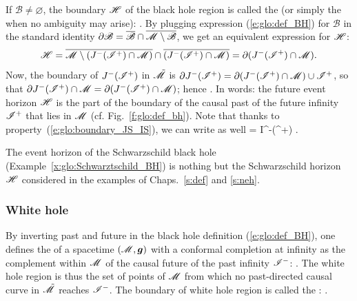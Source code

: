 If $\mathscr{B}\not=\varnothing$, the boundary $\mathscr{H}$ of the black hole region
is called the 
(or simply the 
when no ambiguity may arise):
\be
    .
\ee
By plugging expression (\ref{e:glo:def_BH}) for $\mathscr{B}$ in the standard
identity $\partial \mathscr{B} =
\overline{\mathscr{B}} \cap \overline{\mathscr{M}\setminus \mathscr{B}}$, we get
an equivalent expression for $\mathscr{H}$:
\[
    \mathscr{H} = \overline{\mathscr{M} \setminus (J^-(\mathscr{I}^+)\cap\mathscr{M})} \cap
        \overline{(J^-(\mathscr{I}^+)\cap\mathscr{M})}
        = \partial(J^-(\mathscr{I}^+)\cap\mathscr{M}) .
\]
Now, the boundary of $J^-(\mathscr{I}^+)$ in $\tilde{\mathscr{M}}$ is
$\partial J^-(\mathscr{I}^+) = \partial (J^-(\mathscr{I}^+)\cap\mathscr{M}) \cup \mathscr{I}^+$, so that
$\partial J^-(\mathscr{I}^+) \cap \mathscr{M} =  \partial(J^-(\mathscr{I}^+)\cap\mathscr{M})$; hence
\be \label{e:glo:Hor_bound_past_scrip}
    .
\ee
In words: the future event horizon $\mathscr{H}$ is the part of the boundary of the causal past
of the future infinity $\mathscr{I}^+$ that lies in $\mathscr{M}$ (cf. Fig.~\ref{f:glo:def_bh}).
Note that thanks to property~(\ref{e:glo:boundary_JS_IS}), we can write as
well
\be
    \Hor = \partial I^-(\scri^+) \cap \M .
\ee

\begin{example}
The event horizon of the Schwarzschild black hole (Example~\ref{x:glo:Schwarztschild_BH})
is nothing but the
Schwarzschild horizon $\mathscr{H}$ considered in the examples
of Chaps.~\ref{s:def} and \ref{s:neh}.
\end{example}


\subsubsection{White hole}

By inverting past and future in the black hole definition (\ref{e:glo:def_BH}), one defines
the  of a
spacetime $(\mathscr{M},\bm{g})$ with a conformal completion at infinity as the
complement within $\mathscr{M}$ of the causal future of the past infinity $\mathscr{I}^-$:
\be \label{e:glo:def_white_hole}
     .
\ee
The white hole region is thus the set of points of $\mathscr{M}$
from which no past-directed causal curve in $\tilde{\mathscr{M}}$ reaches $\mathscr{I}^-$.
The boundary of white hole region is called the
:
\be
     .
\ee

